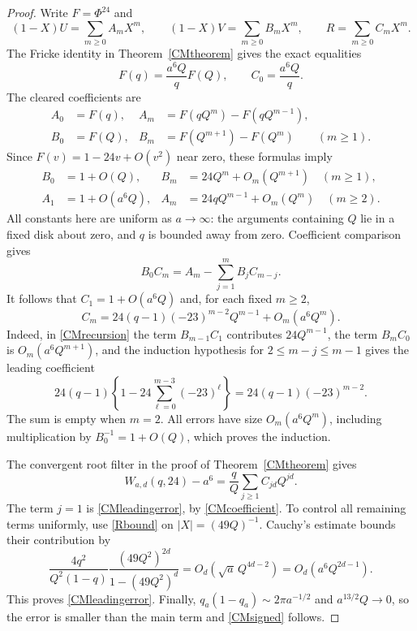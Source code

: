 \documentclass[11pt]{amsart}
\theoremstyle{definition}
\theoremstyle{remark}
\numberwithin{equation}{section}
\begin{document}
\begin{proof}
Write $F=\Phi^{24}$ and
\[
 (1-X)U=\sum_{m\ge0}A_mX^m,\qquad
 (1-X)V=\sum_{m\ge0}B_mX^m,\qquad
 R=\sum_{m\ge0}C_mX^m.
\]
The Fricke identity in Theorem~\ref{CMtheorem} gives the exact equalities
\[
 F(q)=\frac{a^6Q}{q}F(Q),\qquad C_0=\frac{a^6Q}{q}.
\]
The cleared coefficients are
\begin{align*}
 A_0&=F(q),& A_m&=F(qQ^m)-F(qQ^{m-1}),\\
 B_0&=F(Q),& B_m&=F(Q^{m+1})-F(Q^m)\qquad(m\ge1).
\end{align*}
Since $F(v)=1-24v+O(v^2)$ near zero, these formulas imply
\begin{align*}
 B_0&=1+O(Q),&
 B_m&=24Q^m+O_m(Q^{m+1})\quad(m\ge1),\\
 A_1&=1+O(a^6Q),&
 A_m&=24qQ^{m-1}+O_m(Q^m)\quad(m\ge2).
\end{align*}
All constants here are uniform as $a\to\infty$: the arguments containing
$Q$ lie in a fixed disk about zero, and $q$ is bounded away from zero.
Coefficient comparison gives
\begin{equation}\label{CMrecursion}
 B_0C_m=A_m-\sum_{j=1}^mB_jC_{m-j}.
\end{equation}
It follows that $C_1=1+O(a^6Q)$ and, for each fixed $m\ge2$,
\begin{equation}\label{CMcoefficient}
 C_m=24(q-1)(-23)^{m-2}Q^{m-1}+O_m(a^6Q^m).
\end{equation}
Indeed, in \eqref{CMrecursion} the term $B_{m-1}C_1$ contributes
$24Q^{m-1}$, the term $B_mC_0$ is $O_m(a^6Q^{m+1})$, and the induction
hypothesis for $2\le m-j\le m-1$ gives the leading coefficient
\[
 24(q-1)\left\{1-24\sum_{\ell=0}^{m-3}(-23)^\ell\right\}
 =24(q-1)(-23)^{m-2}.
\]
The sum is empty when $m=2$. All errors have size $O_m(a^6Q^m)$,
including multiplication by $B_0^{-1}=1+O(Q)$, which proves the induction.

The convergent root filter in the proof of Theorem~\ref{CMtheorem} gives
\[
 W_{a,d}(q,24)-a^6=\frac qQ\sum_{j\ge1}C_{jd}Q^{jd}.
\]
The term $j=1$ is \eqref{CMleadingerror}, by \eqref{CMcoefficient}.
To control all remaining terms uniformly, use \eqref{Rbound} on
$|X|=(49Q)^{-1}$. Cauchy's estimate bounds their contribution by
\[
 \frac{4q^2}{Q^2(1-q)}
       \frac{(49Q^2)^{2d}}{1-(49Q^2)^d}
 =O_d\!\left(\sqrt a\,Q^{4d-2}\right)
 =O_d(a^6Q^{2d-1}).
\]
This proves \eqref{CMleadingerror}. Finally,
$q_a(1-q_a)\sim2\pi a^{-1/2}$ and
$a^{13/2}Q\to0$, so the error is smaller than the main term and
\eqref{CMsigned} follows.
\end{proof}
\end{document}
